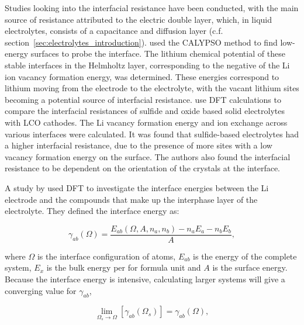 \documentclass[../main.tex]{subfiles}
\begin{document}
Studies looking into the interfacial resistance have been conducted,\cite{Tateyama2019, Okuno2020, Sharafi2017, Jiang2019} with the main source of resistance attributed to the electric double layer, which, in liquid electrolytes, consists of a capacitance and diffusion layer (c.f. section~\ref{sec:electrolytes_introduction}).\cite{Tateyama2019} %
\citeauthor{Tateyama2019} used the CALYPSO method\cite{Wang2012, Gao2019} to find low-energy surfaces to probe the interface. The lithium chemical potential of these stable interfaces in the Helmholtz layer, corresponding to the negative of the Li ion vacancy formation energy, was determined. These energies correspond to lithium moving from the electrode to the electrolyte, with the vacant lithium sites becoming a potential source of interfacial resistance. \citeauthor{Okuno2020} use DFT calculations to compare the interfacial resistances of sulfide and oxide based solid electrolytes with LCO cathodes.\cite{Okuno2020} The Li vacancy formation energy and ion exchange across various interfaces were calculated. It was found that sulfide-based electrolytes had a higher interfacial resistance, due to the presence of more sites with a low vacancy formation energy on the surface. The authors also found the interfacial resistance to be dependent on the orientation of the crystals at the interface. 

A study by \citeauthor{Lepley2015} used DFT to investigate the interface energies between the Li electrode and the compounds that make up the interphase layer of the electrolyte.\cite{Lepley2015} They defined the interface energy as:

\begin{equation}
    \gamma_{ab}(\Omega)=\frac{E_{ab}(\Omega,A,n_a,n_b)-n_aE_a-n_bE_b}{A},
\end{equation}

where $\Omega$ is the interface configuration of atoms, $E_{ab}$ is the energy of the complete system, $E_x$ is the bulk energy per for formula unit and $A$ is the surface energy. Because the interface energy is intensive, calculating larger systems will give a converging value for $\gamma_{ab}$,

\begin{equation}
    \lim_{\Omega_s \rightarrow \Omega} \left[\gamma_{ab}(\Omega_s)\right]=\gamma_{ab}(\Omega),
\end{equation}
\end{document}
